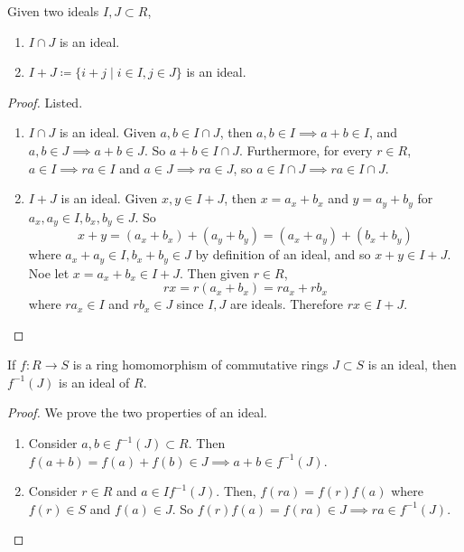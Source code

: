   \begin{theorem} 
    \label{thm:sum_int_ideals}
    Given two ideals $I, J \subset R$, 
    \begin{enumerate}
      \item $I \cap J$ is an ideal. 
      \item $I + J \coloneqq \{i + j \mid i \in I, j \in J\}$ is an ideal. 
    \end{enumerate}
  \end{theorem}
  \begin{proof}
    Listed. 
    \begin{enumerate}
      \item $I \cap J$ is an ideal. Given $a, b \in I \cap J$, then $a, b \in I \implies a + b \in I$, and $a, b \in J \implies a + b \in J$. So $a + b \in I \cap J$. Furthermore, for every $r \in R$, $a \in I \implies r a \in I$ and $a \in J \implies r a \in J$, so $a \in I \cap J \implies ra \in I \cap J$. 

      \item $I + J$ is an ideal. Given $x, y \in I + J$, then $x = a_x + b_x$ and $y = a_y + b_y$ for $a_x, a_y \in I, b_x, b_y \in J$. So 
      \begin{equation}
        x + y = (a_x + b_x) + (a_y + b_y) = (a_x + a_y) + (b_x + b_y)
      \end{equation}
      where $a_x + a_y \in I, b_x + b_y \in J$ by definition of an ideal, and so $x + y \in I + J$. Noe let $x = a_x + b_x \in I + J$. Then given $r \in R$,
      \begin{equation}
        rx = r(a_x + b_x) = r a_x + r b_x
      \end{equation}
      where $r a_x \in I$ and $r b_x \in J$ since $I, J$ are ideals. Therefore $rx \in I + J$.  
    \end{enumerate}
  \end{proof}
  
  \begin{theorem}
    If $f: R \to S$ is a ring homomorphism of commutative rings $J \subset S$ is an ideal, then $f^{-1} (J)$ is an ideal of $R$. 
  \end{theorem}
  \begin{proof}
    We prove the two properties of an ideal. 
    \begin{enumerate}
      \item Consider $a, b \in f^{-1} (J) \subset R$. Then $f(a + b) = f(a) + f(b) \in J \implies a + b \in f^{-1}(J)$. 
      \item Consider $r \in R$ and $a \in I f^{-1}(J)$. Then, $f(ra) = f(r) f(a)$ where $f(r) \in S$ and $f(a) \in J$. So $f(r) f(a) = f(ra) \in J \implies ra \in f^{-1}(J)$. 
    \end{enumerate}
  \end{proof}

